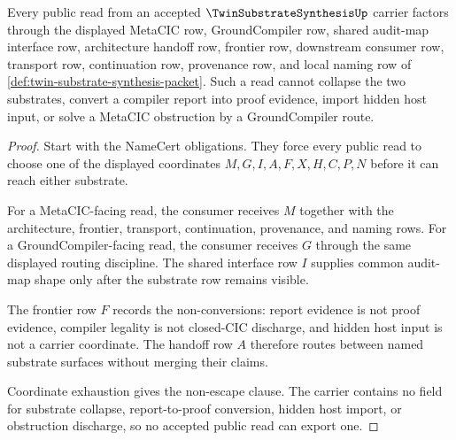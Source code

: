 \begin{theorem}
\label{thm:twin-substrate-synthesis-cross-substrate-nonescape}
Every public read from an accepted $\TwinSubstrateSynthesisUp$ carrier factors through the displayed MetaCIC row, GroundCompiler row, shared audit-map interface row, architecture handoff row, frontier row, downstream consumer row, transport row, continuation row, provenance row, and local naming row of \autoref{def:twin-substrate-synthesis-packet}. Such a read cannot collapse the two substrates, convert a compiler report into proof evidence, import hidden host input, or solve a MetaCIC obstruction by a GroundCompiler route.
\end{theorem}
\begin{proof}
Start with the NameCert obligations. They force every public read to choose one of the displayed coordinates $M,G,I,A,F,X,H,C,P,N$ before it can reach either substrate.

For a MetaCIC-facing read, the consumer receives $M$ together with the architecture, frontier, transport, continuation, provenance, and naming rows. For a GroundCompiler-facing read, the consumer receives $G$ through the same displayed routing discipline. The shared interface row $I$ supplies common audit-map shape only after the substrate row remains visible.

The frontier row $F$ records the non-conversions: report evidence is not proof evidence, compiler legality is not closed-CIC discharge, and hidden host input is not a carrier coordinate. The handoff row $A$ therefore routes between named substrate surfaces without merging their claims.

Coordinate exhaustion gives the non-escape clause. The carrier contains no field for substrate collapse, report-to-proof conversion, hidden host import, or obstruction discharge, so no accepted public read can export one.
\end{proof}


